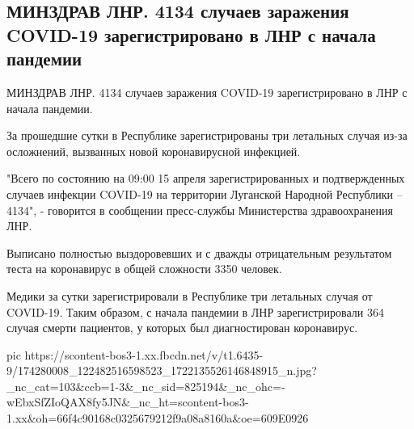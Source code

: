 
 
 
 
 

\subsection{МИНЗДРАВ ЛНР. 4134 случаев заражения COVID-19 зарегистрировано в ЛНР с начала пандемии}

МИНЗДРАВ ЛНР. 4134 случаев заражения COVID-19 зарегистрировано в ЛНР с начала пандемии.

За прошедшие сутки в Республике зарегистрированы три летальных случая из-за осложнений, вызванных новой коронавирусной инфекцией.

"Всего по состоянию на 09:00 15 апреля зарегистрированных и подтвержденных
случаев инфекции COVID-19 на территории Луганской Народной Республики – 4134",
- говорится в сообщении пресс-службы Министерства здравоохранения ЛНР.

Выписано полностью выздоровевших и с дважды отрицательным результатом теста на коронавирус в общей сложности 3350 человек.

Медики за сутки зарегистрировали в Республике три летальных случая от COVID-19.
Таким образом, с начала пандемии в ЛНР зарегистрировали 364 случая смерти
пациентов, у которых был диагностирован коронавирус.

\ifcmt
  pic https://scontent-bos3-1.xx.fbcdn.net/v/t1.6435-9/174280008_122482516598523_1722135526146848915_n.jpg?_nc_cat=103&ccb=1-3&_nc_sid=825194&_nc_ohc=-wEbxSfZIoQAX8fy5JN&_nc_ht=scontent-bos3-1.xx&oh=66f4c90168c0325679212f9a08a8160a&oe=609E0926
\fi

